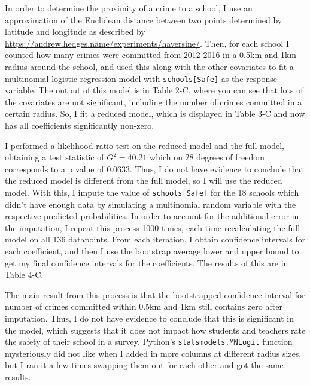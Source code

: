 \documentclass[11pt]{article}
\newcommand{\1}{\mathds{1}}
\def\code#1{\texttt{#1}}
\begin{document}
In order to determine the proximity of a crime to a school, I use an approximation of the Euclidean distance between two points determined by latitude and longitude as described by \\ \href{url}{https://andrew.hedges.name/experiments/haversine/}. Then, for each school I counted how many crimes were committed from 2012-2016 in a 0.5km and 1km radius around the school, and used this along with the other covariates to fit a multinomial logistic regression model with \code{schools[Safe]} as the response variable. The output of this model is in Table 2-C, where you can see that lots of the covariates are not significant, including the number of crimes committed in a certain radius. So, I fit a reduced model, which is displayed in Table 3-C and now has all coefficients significantly non-zero. 

I performed a likelihood ratio test on the reduced model and the full model, obtaining a test statistic of $G^2 = 40.21$ which on 28 degrees of freedom corresponds to a p value of 0.0633. Thus, I do not have evidence to conclude that the reduced model is different from the full model, so I will use the reduced model. With this, I impute the value of \code{schools[Safe]} for the 18 schools which didn't have enough data by simulating a multinomial random variable with the respective predicted probabilities. In order to account for the additional error in the imputation, I repeat this process 1000 times, each time recalculating the full model on all 136 datapoints. From each iteration, I obtain confidence intervals for each coefficient, and then I use the bootstrap average lower and upper bound to get my final confidence intervals for the coefficients. The results of this are in Table 4-C.

The main result from this process is that the bootstrapped confidence interval for number of crimes committed within 0.5km and 1km still contains zero after imputation. Thus, I do not have evidence to conclude that this is significant in the model, which suggests that it does not impact how students and teachers rate the safety of their school in a survey. Python's \code{statsmodels.MNLogit} function mysteriously did not like when I added in more columns at different radius sizes, but I ran it a few times swapping them out for each other and got the same results.

\end{document}
